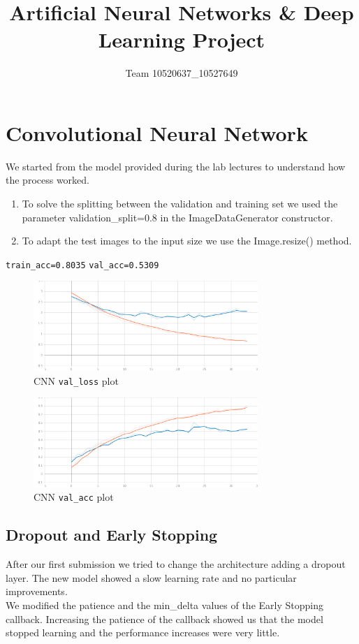 \documentclass{article}
\title{Artificial Neural Networks \& Deep Learning Project}
\author{Team 10520637\_10527649}
\begin{document}
	
	\maketitle

	\section{Convolutional Neural Network}
	
	We started from the model provided during the lab lectures to understand how the process worked.
	
	\begin{enumerate}
		\item To solve the splitting between the validation and training set we used the parameter validation\_split=0.8 in the ImageDataGenerator constructor.
		\item To adapt the test images to the input size we use the Image.resize() method.
	\end{enumerate}	
	
	\texttt{train\_acc=0.8035}
	\texttt{val\_acc=0.5309}
	
	\begin{figure}[H]
		\centering
			\includegraphics[height=3.4cm, keepaspectratio]{CNN_LOSS.jpg}
			\caption{CNN \texttt{val\_loss} plot}
	\end{figure}
	
	\begin{figure}[H]
		\centering
			\includegraphics[height=3.4cm, keepaspectratio]{CNN_ACC.jpg}
			\caption{CNN \texttt{val\_acc} plot}
	\end{figure}
		
	
	\subsection{Dropout and Early Stopping}
	After our first submission we tried to change the architecture adding a dropout layer. The new model showed a slow learning rate and no particular improvements. \\
	We modified the patience and the min\_delta values of the Early Stopping callback. Increasing the patience of the callback showed us that the model stopped learning and the performance increases were very little.
	
\end{document}
